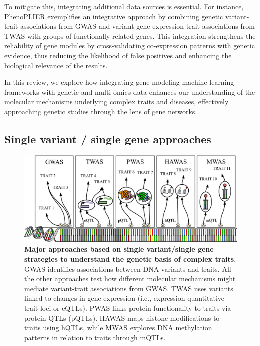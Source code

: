 To mitigate this, integrating additional data sources is essential.
For instance, PhenoPLIER exemplifies an integrative approach by combining genetic variant-trait associations from GWAS and variant-gene expression-trait associations from TWAS with groups of functionally related genes.
This integration strengthens the reliability of gene modules by cross-validating co-expression patterns with genetic evidence, thus reducing the likelihood of false positives and enhancing the biological relevance of the results.

In this review, we explore how integrating gene modeling machine learning frameworks with genetic and multi-omics data enhances our understanding of the molecular mechanisms underlying complex traits and diseases, effectively approaching genetic studies through the lens of gene networks.

\hypertarget{single-variant-single-gene-approaches}{%
\subsection{Single variant / single gene approaches}\label{single-variant-single-gene-approaches}}

\begin{figure}
\hypertarget{fig:fig1}{%
\centering
\includegraphics[width=1\textwidth,height=\textheight]{images/fig1.svg}
\caption{\textbf{Major approaches based on single variant/single gene strategies to understand the genetic basis of complex traits}.
GWAS identifies associations between DNA variants and traits.
All the other approaches test how different molecular mechanisms might mediate variant-trait associations from GWAS.
TWAS uses variants linked to changes in gene expression (i.e., expression quantitative trait loci or eQTLs).
PWAS links protein functionality to traits via protein QTLs (pQTLs).
HAWAS maps histone modifications to traits using hQTLs, while MWAS explores DNA methylation patterns in relation to traits through mQTLs.}\label{fig:fig1}
}
\end{figure}

